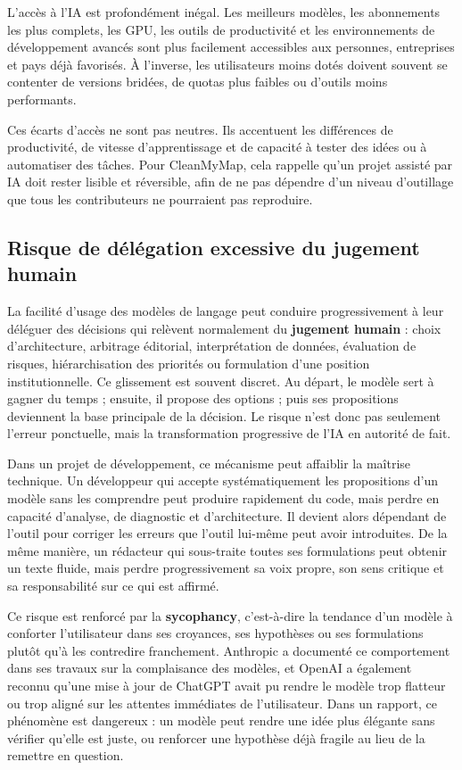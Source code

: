 \documentclass[
  10pt,
  a4paper,
  DIV=11,
  numbers=noendperiod,
  oneside]{scrreprt}
\let\oldtextbf\textbf
\renewcommand{\textbf}[1]{\oldtextbf{\textcolor{cmmnavy}{#1}}}
\begin{document}
L'accès à l'IA est profondément inégal. Les meilleurs modèles, les
abonnements les plus complets, les GPU, les outils de productivité et
les environnements de développement avancés sont plus facilement
accessibles aux personnes, entreprises et pays déjà favorisés. À
l'inverse, les utilisateurs moins dotés doivent souvent se contenter de
versions bridées, de quotas plus faibles ou d'outils moins performants.

Ces écarts d'accès ne sont pas neutres. Ils accentuent les différences
de productivité, de vitesse d'apprentissage et de capacité à tester des
idées ou à automatiser des tâches. Pour CleanMyMap, cela rappelle qu'un
projet assisté par IA doit rester lisible et réversible, afin de ne pas
dépendre d'un niveau d'outillage que tous les contributeurs ne
pourraient pas reproduire.

\subsection{Risque de délégation excessive du jugement
humain}\label{risque-de-duxe9luxe9gation-excessive-du-jugement-humain}

La facilité d'usage des modèles de langage peut conduire progressivement
à leur déléguer des décisions qui relèvent normalement du
\textbf{jugement humain} : choix d'architecture, arbitrage éditorial,
interprétation de données, évaluation de risques, hiérarchisation des
priorités ou formulation d'une position institutionnelle. Ce glissement
est souvent discret. Au départ, le modèle sert à gagner du temps ;
ensuite, il propose des options ; puis ses propositions deviennent la
base principale de la décision. Le risque n'est donc pas seulement
l'erreur ponctuelle, mais la transformation progressive de l'IA en
autorité de fait.

Dans un projet de développement, ce mécanisme peut affaiblir la maîtrise
technique. Un développeur qui accepte systématiquement les propositions
d'un modèle sans les comprendre peut produire rapidement du code, mais
perdre en capacité d'analyse, de diagnostic et d'architecture. Il
devient alors dépendant de l'outil pour corriger les erreurs que l'outil
lui-même peut avoir introduites. De la même manière, un rédacteur qui
sous-traite toutes ses formulations peut obtenir un texte fluide, mais
perdre progressivement sa voix propre, son sens critique et sa
responsabilité sur ce qui est affirmé.

Ce risque est renforcé par la \textbf{sycophancy}, c'est-à-dire la
tendance d'un modèle à conforter l'utilisateur dans ses croyances, ses
hypothèses ou ses formulations plutôt qu'à les contredire franchement.
Anthropic a documenté ce comportement dans ses travaux sur la
complaisance des modèles, et OpenAI a également reconnu qu'une mise à
jour de ChatGPT avait pu rendre le modèle trop flatteur ou trop aligné
sur les attentes immédiates de l'utilisateur. Dans un rapport, ce
phénomène est dangereux : un modèle peut rendre une idée plus élégante
sans vérifier qu'elle est juste, ou renforcer une hypothèse déjà fragile
au lieu de la remettre en question.
\end{document}

